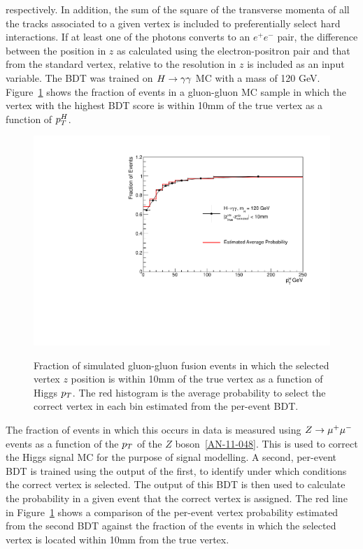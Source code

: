 respectively. In addition, the sum of the square of the transverse momenta of all the tracks associated 
to a given vertex is included to preferentially select hard interactions. If at least one of the 
photons converts to an $e^{+}e^{-}$ pair, the difference between the position in $z$ as calculated 
using the electron-positron pair and that from the standard vertex, relative to the resolution in $z$
is included as an input variable. The BDT was trained on $H\rightarrow\gamma\gamma$ MC with a mass of 120 GeV. 
Figure~\ref{fig:vtxeffhmc} shows the fraction of events in a gluon-gluon MC sample in which 
the vertex with the highest BDT score is within 10mm of the true vertex as a function of $p_{T}^{H}$.

\begin{figure}
\begin{center}
\includegraphics[width=.8\textwidth]{hgg7TeV/generalPlots/vtxEffHMC.pdf}
\label{fig:vtxeffhmc}
\caption{Fraction of simulated gluon-gluon fusion events in which the selected vertex $z$ position 
is within 10mm of the true vertex as a function of Higgs $p_{T}$. The red histogram is the average 
probability to select the correct vertex in each bin estimated from the per-event BDT.}
\end{center}
\end{figure} 

The fraction of events in which this occurs in data is measured using $Z\rightarrow \mu^{+}\mu^{-}$ events
as a function of the $p_{T}$ of the $Z$ boson~\ref{AN-11-048}. This is used to correct the Higgs signal MC for 
the purpose of signal modelling. A second, per-event BDT is trained using the output of the first, to identify 
under which conditions the correct vertex is selected. The output of this BDT is then used to 
calculate the probability in a given event that the correct vertex is assigned. The red line in Figure~\ref{fig:vtxeffhmc}
shows a comparison of the per-event vertex probability estimated from the second BDT against the 
fraction of the events in which the selected vertex is located within 10mm from the true vertex.

